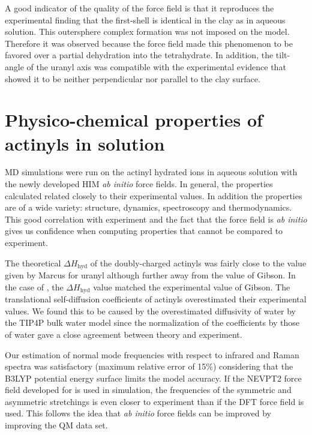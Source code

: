  A good indicator of the quality of the force field is that it reproduces the experimental finding 
that the first-shell is identical in the clay as in aqueous 
solution.\cite{GeoCosmoAct_Catalano_2005} This outersphere complex 
formation was not imposed on the model. Therefore it was observed because the force field 
made this 
phenomenon to be favored over a partial dehydration into the tetrahydrate. In addition, the 
tilt-angle of the uranyl axis was compatible with the experimental evidence that showed it to be 
neither perpendicular nor parallel to the clay surface.\cite{MinWatIntClEq_Denecke_1999}

\section[Physico-chemical properties of actinyls in solution]{Physico-chemical properties of 
actinyls in solution}
MD simulations were run on the actinyl hydrated ions in aqueous solution with the 
newly developed HIM \textit{ab initio} force fields. In general, the properties calculated related 
closely to their experimental values. In addition the properties are of a 
wide variety: structure, dynamics, spectroscopy and thermodynamics. This good correlation
with experiment and the fact that the force field is \textit{ab initio} gives us  
confidence when computing properties that cannot be compared to experiment. 

The theoretical 
$\Delta H_\text{hyd}$ of the doubly-charged actinyls was fairly close to the value given by 
Marcus\cite{JChemSoc_Marcus_1986} for uranyl although further away from the value of 
Gibson\cite{JPhysChemA_Gibson_2005}. In the case of  \ce{[NpO2]^{+}}, the $\Delta 
H_\text{hyd}$ value matched the experimental value of 
Gibson\cite{JPhysChemA_Gibson_2005}. 
The translational self-diffusion coefficients of actinyls overestimated their experimental values. 
We found this to be caused by the overestimated diffusivity of water by the TIP4P bulk water 
model since the normalization of the coefficients by those of water 
gave a close agreement between theory and experiment. 

Our estimation of normal mode frequencies 
with respect to infrared and Raman spectra was satisfactory (maximum relative error of 15\%) 
considering 
that the B3LYP potential energy surface limits the model accuracy. If the NEVPT2 force field 
developed for \ce{[NpO2]^{+}} is used in simulation, the frequencies of the symmetric and 
asymmetric stretchings is even closer to experiment than if the DFT force field is used. This 
follows the 
idea that \textit{ab initio} force fields can be improved by improving the QM data set. 

